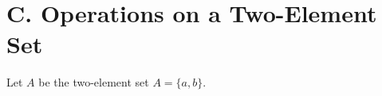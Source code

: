 \documentclass[12pt]{article}
\begin{document}
\begin{flushleft}
\begin{enumerate}
\begin{enumerate}
	\end{enumerate}

\end{enumerate}


\section*{C. Operations on a Two-Element Set}

Let $A$ be the two-element set $A = \{a,b\}$.













\end{flushleft}
\end{document}
